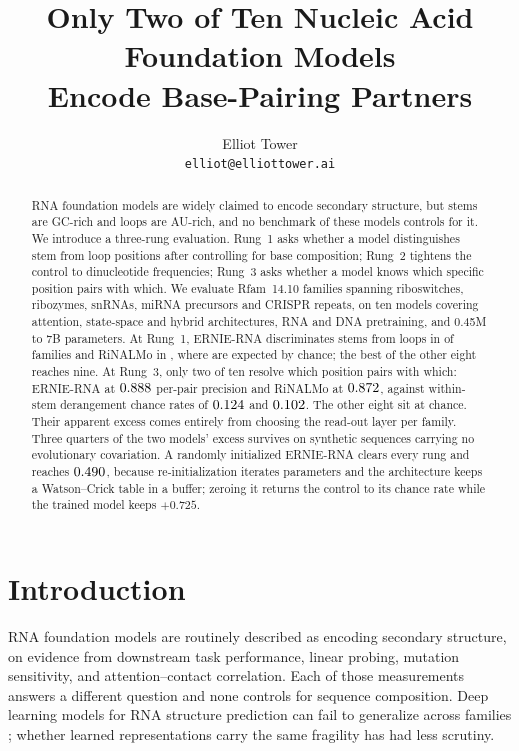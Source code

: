 \documentclass{article}
\title{Only Two of Ten Nucleic Acid Foundation Models\\Encode Base-Pairing Partners}
\author{%
  Elliot Tower\\
  \texttt{elliot@elliottower.ai}\\
}
\begin{document}
\maketitle

\begin{abstract}
RNA foundation models are widely claimed to encode secondary structure, but
stems are GC-rich and loops are AU-rich, and no benchmark of these models
controls for it. We introduce a three-rung evaluation. Rung~1 asks whether a
model distinguishes stem from loop positions after controlling for base
composition; Rung~2 tightens the control to dinucleotide frequencies; Rung~3
asks whether a model knows which specific position pairs with which. We evaluate
\panelN{} Rfam~14.10 families spanning riboswitches, ribozymes, snRNAs, miRNA
precursors and CRISPR repeats, on ten models covering attention, state-space and
hybrid architectures, RNA and DNA pretraining, and 0.45M to 7B parameters. At
Rung~1, ERNIE-RNA discriminates stems from loops in \exceedErnieRNA{} of
\panelN{} families and RiNALMo in \exceedRiNALMo{}, where
\expectedFalsePositives{} are expected by chance; the best of the other eight
reaches nine. At Rung~3, only two of ten resolve which position pairs with
which: ERNIE-RNA at $0.888{}$ per-pair precision and RiNALMo at
$0.872{}$, against within-stem derangement chance rates of
$0.124{}$ and $0.102{}$. The other eight sit
at chance. Their apparent excess comes entirely from choosing the read-out layer
per family. Three quarters of the two models' excess survives on synthetic
sequences carrying no evolutionary covariation. A randomly initialized ERNIE-RNA
clears every rung and reaches $0.490{}$, because
re-initialization iterates
parameters and the architecture keeps a Watson--Crick table in a buffer; zeroing
it returns the control to its chance rate while the trained model keeps
$+0.725$.
\end{abstract}

\section{Introduction}
\label{sec:intro}

RNA foundation models are routinely described as encoding secondary structure,
on evidence from downstream task performance, linear probing, mutation
sensitivity, and attention--contact correlation. Each of those measurements
answers a different question and none controls for sequence composition. Deep
learning models for RNA structure prediction can fail to generalize across
families \citep{szikszai2022generalization}; whether learned representations
carry the same fragility has had less scrutiny.
\end{document}
